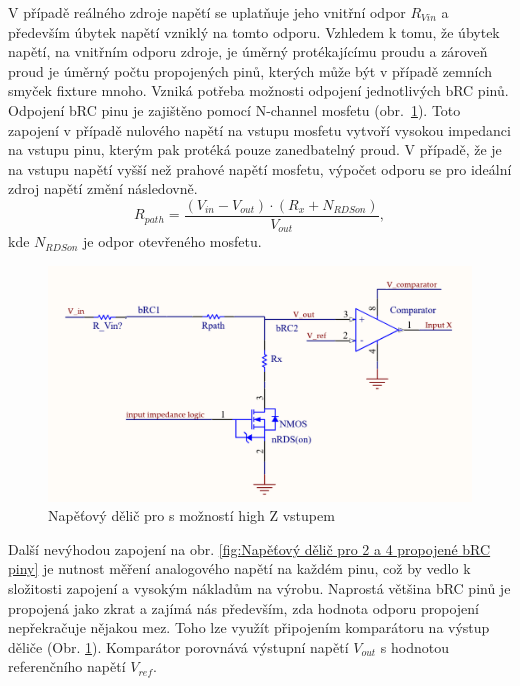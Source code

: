 V případě reálného zdroje napětí se uplatňuje jeho vnitřní odpor $R_{Vin}$ a především úbytek napětí vzniklý na tomto odporu.
Vzhledem k tomu, že úbytek napětí, na vnitřním odporu zdroje,
je úměrný protékajícímu proudu a zároveň proud je úměrný počtu propojených pinů,
kterých může být v případě zemních smyček fixture mnoho.
Vzniká potřeba možnosti odpojení jednotlivých bRC pinů. Odpojení bRC pinu je zajištěno pomocí N-channel mosfetu
\hbox{(obr. \ref{fig:Napěťový dělič pro s možností high Z vstupem}).}
Toto zapojení v případě nulového napětí na vstupu mosfetu vytvoří vysokou impedanci na vstupu
pinu, kterým pak protéká pouze zanedbatelný proud. V případě, že je na vstupu napětí vyšší než prahové napětí mosfetu,
výpočet odporu se pro ideální zdroj napětí změní následovně.
\begin{equation}
    R_{path} = \frac{(V_{in} - V_{out}) \cdot (R_x + N_{RDSon}) }{V_{out}},
\end{equation}
 kde $N_{RDSon}$ je odpor otevřeného mosfetu.

\clearpage
\begin{figure}[ht!]
    \centering
    \includegraphics[width = 1\textwidth]{obrazky/nMos_Connection.png}
    \caption{Napěťový dělič pro s možností high Z vstupem}
    \label{fig:Napěťový dělič pro s možností high Z vstupem}
\end{figure}

Další nevýhodou zapojení na obr. \ref{fig:Napěťový dělič pro 2 a 4 propojené bRC piny}
je nutnost měření analogového napětí na každém pinu, což by vedlo k
složitosti zapojení a vysokým nákladům na výrobu. Naprostá většina bRC pinů je propojená jako zkrat a zajímá nás především,
zda hodnota odporu propojení nepřekračuje nějakou mez.
Toho lze využít připojením komparátoru na výstup děliče (Obr. \ref{fig:Napěťový dělič pro s možností high Z vstupem}).
Komparátor porovnává výstupní napětí $V_{out}$ s hodnotou referenčního napětí $V_{ref}$.\par

